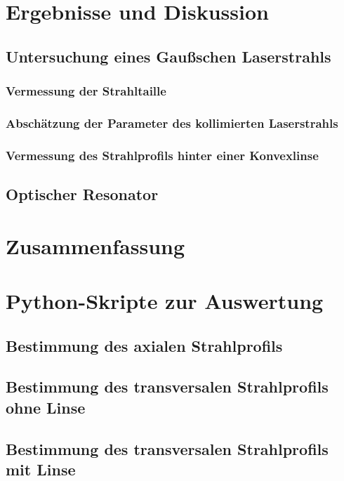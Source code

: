 \documentclass[11pt,a4paper,oneside]{scrartcl}
\begin{document}
\section{Ergebnisse und Diskussion}
\subsection{Untersuchung eines Gaußschen Laserstrahls}
\subsubsection{Vermessung der Strahltaille}
\subsubsection{Abschätzung der Parameter des kollimierten Laserstrahls}
\subsubsection{Vermessung des Strahlprofils hinter einer Konvexlinse}
\subsection{Optischer Resonator}
\section{Zusammenfassung}
\newpage

 

\appendix

\section{Python-Skripte zur Auswertung}
\subsection{Bestimmung des axialen Strahlprofils}

\subsection{Bestimmung des transversalen Strahlprofils ohne Linse}

\subsection{Bestimmung des transversalen Strahlprofils mit Linse}

\end{document}

